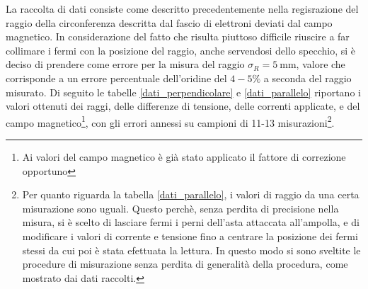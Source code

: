 \documentclass[a4paper,11pt]{article}
\begin{document}
		La raccolta di dati consiste come descritto precedentemente nella regisrazione del raggio della circonferenza descritta dal fascio di elettroni deviati dal campo magnetico. In considerazione del fatto che risulta piuttoso difficile riuscire a far collimare i fermi con la posizione del raggio, anche servendosi dello specchio, si è deciso di prendere come errore per la misura del raggio $\sigma_R = \SI{5}{\milli\meter}$, valore che corrisponde a un errore percentuale dell'oridine del $4-5\%$ a seconda del raggio misurato. Di seguito le tabelle \ref{dati_perpendicolare} e \ref{dati_parallelo} riportano i valori ottenuti dei raggi, delle differenze di tensione, delle correnti applicate, e del campo magnetico\footnote{Ai valori del campo magnetico è già stato applicato il fattore di correzione opportuno}, con gli errori annessi su campioni di 11-13 misurazioni\footnote{Per quanto riguarda la tabella \ref{dati_parallelo}, i valori di raggio da una certa misurazione sono uguali. Questo perchè, senza perdita di precisione nella misura, si è scelto di lasciare fermi i perni dell'asta attaccata all'ampolla, e di modificare i valori di corrente e tensione fino a centrare la posizione dei fermi stessi da cui poi è stata efettuata la lettura. In questo modo si sono sveltite le procedure di misurazione senza perdita di generalità della procedura, come mostrato dai dati raccolti.}.
		
\end{document}
